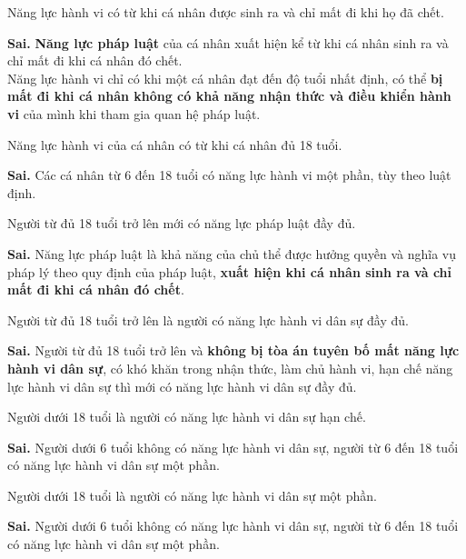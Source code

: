 \begin{ques}
Năng lực hành vi có từ khi cá nhân được sinh ra và chỉ mất đi khi họ đã chết.
\end{ques}
\begin{ans}
\textbf{Sai.} \textbf{Năng lực pháp luật} của cá nhân xuất hiện kể từ khi cá nhân sinh ra và chỉ mất đi khi cá nhân đó chết.\\
Năng lực hành vi chỉ có khi một cá nhân đạt đến độ tuổi nhất định, có thể \textbf{bị mất đi khi cá nhân không có khả năng nhận thức và điều khiển hành vi} của mình khi tham gia quan hệ pháp luật.
\end{ans}

\begin{ques}
Năng lực hành vi của cá nhân có từ khi cá nhân đủ 18 tuổi.
\end{ques}
\begin{ans}
\textbf{Sai.} Các cá nhân từ 6 đến 18 tuổi có năng lực hành vi một phần, tùy theo luật định.
\end{ans}

\begin{ques}
Người từ đủ 18 tuổi trở lên mới có năng lực pháp luật đầy đủ.
\end{ques}
\begin{ans}
\textbf{Sai.} Năng lực pháp luật là khả năng của chủ thể được hưởng quyền và nghĩa vụ pháp lý theo quy định của pháp luật, \textbf{xuất hiện khi cá nhân sinh ra và chỉ mất đi khi cá nhân đó chết}.
\end{ans}

\begin{ques}
Người từ đủ 18 tuổi trở lên là người có năng lực hành vi dân sự đầy đủ.
\end{ques}
\begin{ans}
\textbf{Sai.} Người từ đủ 18 tuổi trở lên và \textbf{không bị tòa án tuyên bố mất năng lực hành vi dân sự}, có khó khăn trong nhận thức, làm chủ hành vi, hạn chế năng lực hành vi dân sự thì mới có năng lực hành vi dân sự đầy đủ.
\end{ans}

\begin{ques}
Người dưới 18 tuổi là người có năng lực hành vi dân sự hạn chế.
\end{ques}
\begin{ans}
\textbf{Sai.} Người dưới 6 tuổi không có năng lực hành vi dân sự, người từ 6 đến 18 tuổi có năng lực hành vi dân sự một phần.
\end{ans}

\begin{ques}
Người dưới 18 tuổi là người có năng lực hành vi dân sự một phần.
\end{ques}
\begin{ans}
\textbf{Sai.} Người dưới 6 tuổi không có năng lực hành vi dân sự, người từ 6 đến 18 tuổi có năng lực hành vi dân sự một phần.
\end{ans}

